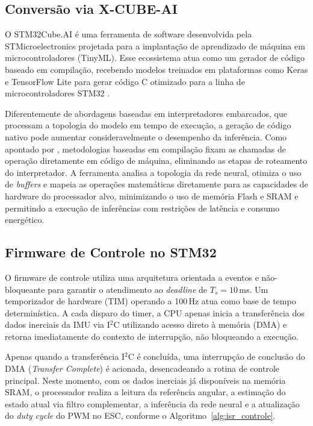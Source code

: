 \subsection{Conversão via X-CUBE-AI}

O STM32Cube.AI é uma ferramenta de software desenvolvida pela STMicroelectronics projetada para a implantação de aprendizado de máquina em microcontroladores (TinyML). Esse ecossistema atua como um gerador de código baseado em compilação, recebendo modelos treinados em plataformas como Keras e TensorFlow Lite para gerar código C otimizado para a linha de microcontroladores STM32 \cite{stmu2526}.

Diferentemente de abordagens baseadas em interpretadores embarcados, que processam a topologia do modelo em tempo de execução, a geração de código nativo pode aumentar consideravelmente o desempenho da inferência. Como apontado por , metodologias baseadas em compilação fixam as chamadas de operação diretamente em código de máquina, eliminando as etapas de roteamento do interpretador. A ferramenta analisa a topologia da rede neural, otimiza o uso de \textit{buffers} e mapeia as operações matemáticas diretamente para as capacidades de hardware do processador alvo, minimizando o uso de memória Flash e SRAM e permitindo a execução de inferências com restrições de latência e consumo energético.

\subsection{Firmware de Controle no STM32}

O firmware de controle utiliza uma arquitetura orientada a eventos e não-bloqueante para garantir o atendimento ao \textit{deadline} de $T_s = 10$\,ms. Um temporizador de hardware (TIM) operando a 100\,Hz atua como base de tempo determinística. A cada disparo do timer, a CPU apenas inicia a transferência dos dados inerciais da IMU via I$^2$C utilizando acesso direto à memória (DMA) e retorna imediatamente do contexto de interrupção, não bloqueando a execução.

Apenas quando a transferência I$^2$C é concluída, uma interrupção de conclusão do DMA (\textit{Transfer Complete}) é acionada, desencadeando a rotina de controle principal. Neste momento, com os dados inerciais já disponíveis na memória SRAM, o processador realiza a leitura da referência angular, a estimação do estado atual via filtro complementar, a inferência da rede neural e a atualização do \textit{duty cycle} do PWM no ESC, conforme o Algoritmo~\ref{alg:isr_controle}.


